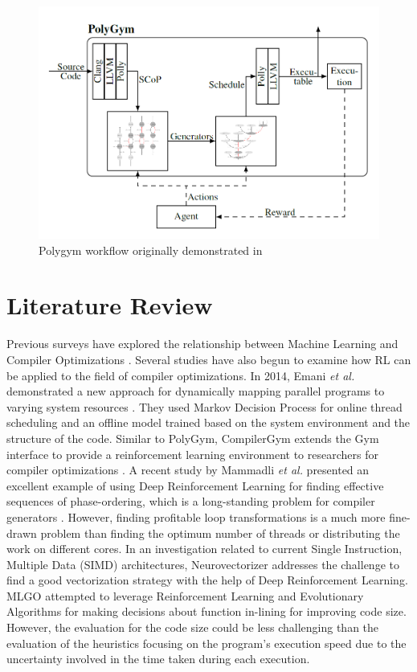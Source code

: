 \documentclass[logo,msc]{infthesis}           %
\begin{document}
\begin{figure}[htbp]
  \centering
  \includegraphics[width=\textwidth]{Images/PolyGym.png}    
  \caption{Polygym workflow originally demonstrated in \cite{P1}}
  \label{fig:polygym}
\end{figure}

\section{Literature Review}

Previous surveys have explored the relationship between Machine Learning and Compiler Optimizations \cite{8357388}\cite{9232934}. Several studies have also begun to examine how RL can be applied to the field of compiler optimizations. In 2014, Emani \textit{et al.} demonstrated a new approach for dynamically mapping parallel programs to varying system resources \cite{10.1007}. They used Markov Decision Process for online thread scheduling and an offline model trained based on the system environment and the structure of the code. Similar to PolyGym, CompilerGym extends the Gym interface to provide a reinforcement learning environment to researchers for compiler optimizations \cite{CompilerGym}. A recent study by Mammadli \textit{et al.} presented an excellent example of using Deep Reinforcement Learning for finding effective sequences of phase-ordering, which is a long-standing problem for compiler generators \cite{static.neural}. However, finding profitable loop transformations is a much more fine-drawn problem than finding the optimum number of threads or distributing the work on different cores. In an investigation related to current Single Instruction, Multiple Data (SIMD) architectures, Neurovectorizer \cite{NeuroVectorizer} addresses the challenge to find a good vectorization strategy with the help of Deep Reinforcement Learning. MLGO \cite{10.48550} attempted to leverage Reinforcement Learning and Evolutionary Algorithms for making decisions about function in-lining for improving code size. However, the evaluation for the code size could be less challenging than the evaluation of the heuristics focusing on the program's execution speed due to the uncertainty involved in the time taken during each execution.
\end{document}
